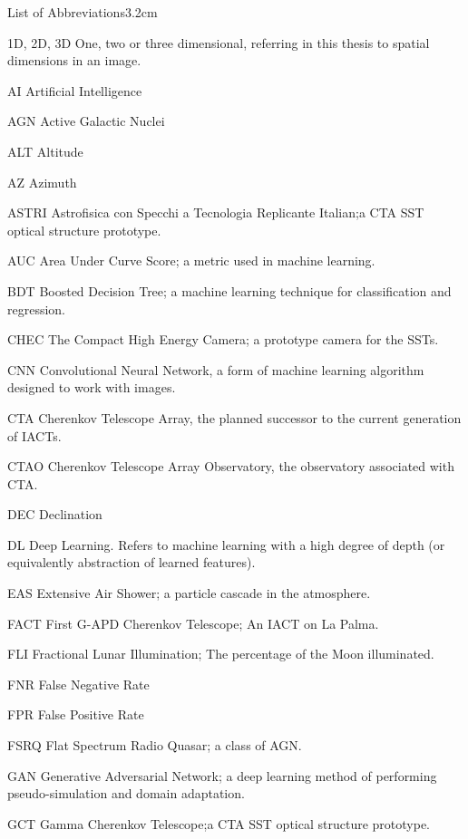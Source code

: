 \begin{mclistof}{List of Abbreviations}{3.2cm}

\item[1D, 2D, 3D] One, two or three dimensional, referring in this thesis to spatial dimensions in an image.
\item[AI] Artificial Intelligence
\item[AGN] Active Galactic Nuclei
\item[ALT] Altitude
\item[AZ] Azimuth
\item[ASTRI] Astrofisica con Specchi a Tecnologia Replicante Italian;a CTA SST optical structure prototype.
\item[AUC] Area Under Curve Score; a metric used in machine learning.
\item[BDT] Boosted Decision Tree; a machine learning technique for classification and regression.
\item[CHEC] The Compact High Energy Camera; a prototype camera for the SSTs.
\item[CNN] Convolutional Neural Network, a form of machine learning algorithm designed to work with images.
\item[CTA] Cherenkov Telescope Array, the planned successor to the current generation of IACTs.
\item[CTAO] Cherenkov Telescope Array Observatory, the observatory associated with CTA.
\item[DEC] Declination
\item[DL] Deep Learning. Refers to machine learning with a high degree of depth (or equivalently abstraction of learned features).
\item[EAS] Extensive Air Shower; a particle cascade in the atmosphere.
\item[FACT] First G-APD Cherenkov Telescope; An IACT on La Palma.
\item[FLI] Fractional Lunar Illumination; The percentage of the Moon illuminated.
\item[FNR] False Negative Rate
\item[FPR] False Positive Rate
\item[FSRQ] Flat Spectrum Radio Quasar; a class of AGN.
\item[GAN] Generative Adversarial Network; a deep learning method of performing pseudo-simulation and domain adaptation.
\item[GCT] Gamma Cherenkov Telescope;a CTA SST optical structure prototype.

\end{mclistof}

